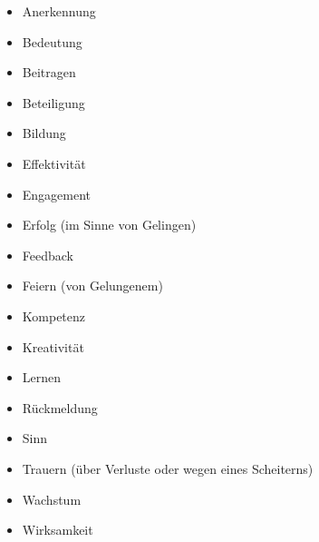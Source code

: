 \begin{multicols}{2}
  \begin{itemize}
    \item Anerkennung
    \item Bedeutung
    \item Beitragen
    \item Beteiligung
    \item Bildung
    \item Effektivität
    \item Engagement
    \item Erfolg (im Sinne von \glqq Gelingen\grqq)
    \item Feedback
    \item Feiern (von Gelungenem)
    \item Kompetenz
    \item Kreativität
    \item Lernen
    \item Rückmeldung
    \item Sinn
    \item Trauern (über Verluste oder wegen eines Scheiterns)
    \item Wachstum
    \item Wirksamkeit
  \end{itemize}
\end{multicols}

